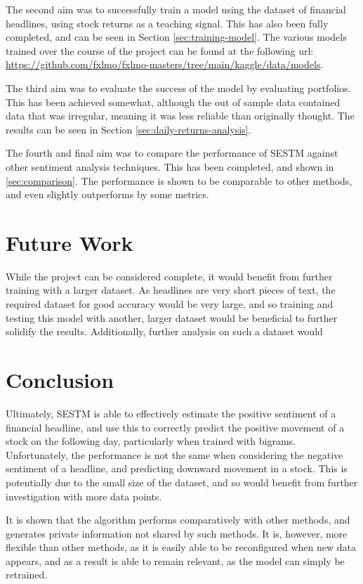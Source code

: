 The second aim was to successfully train a model using the dataset of financial headlines, using stock returns as a teaching signal. This has also been fully completed, and can be seen in Section \ref{sec:training-model}. The various models trained over the course of the project can be found at the following url: \url{https://github.com/fxlmo/fxlmo-masters/tree/main/kaggle/data/models}.

The third aim was to evaluate the success of the model by evaluating portfolios. This has been achieved somewhat, although the out of sample data contained data that was irregular, meaning it was less reliable than originally thought. The results can be seen in Section \ref{sec:daily-returns-analysis}. 

The fourth and final aim was to compare the performance of SESTM against other sentiment analysis techniques. This has been completed, and shown in \ref{sec:comparison}. The performance is shown to be comparable to other methods, and even slightly outperforms by some metrics.

\section{Future Work}
While the project can be considered complete, it would benefit from further training with a larger dataset. As headlines are very short pieces of text, the required dataset for good accuracy would be very large, and so training and testing this model with another, larger dataset would be beneficial to further solidify the results. Additionally, further analysis on such a dataset would 

\section{Conclusion}
Ultimately, SESTM is able to effectively estimate the positive sentiment of a financial headline, and use this to correctly predict the positive movement of a stock on the following day, particularly when trained with bigrams. Unfortunately, the performance is not the same when considering the negative sentiment of a headline, and predicting downward movement in a stock. This is potentially due to the small size of the dataset, and so would benefit from further investigation with more data points.

It is shown that the algorithm performs comparatively with other methods, and generates private information not shared by such methods. It is, however, more flexible than other methods, as it is easily able to be reconfigured when new data appears, and as a result is able to remain relevant, as the model can simply be retrained.


